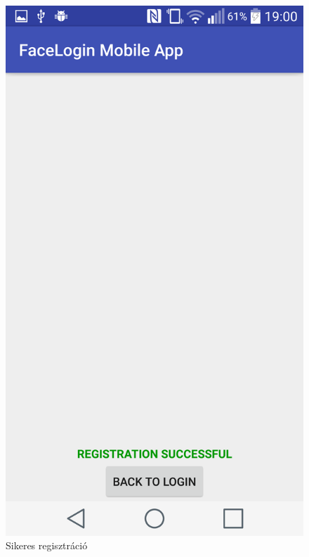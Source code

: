 \begin{figure}[h]
\begin{minipage}{.30\textwidth}
     \includegraphics[scale=0.10]{img/registration_successful}
     \caption{Sikeres regisztráció}
 \end{minipage}
\end{figure}
\clearpage
